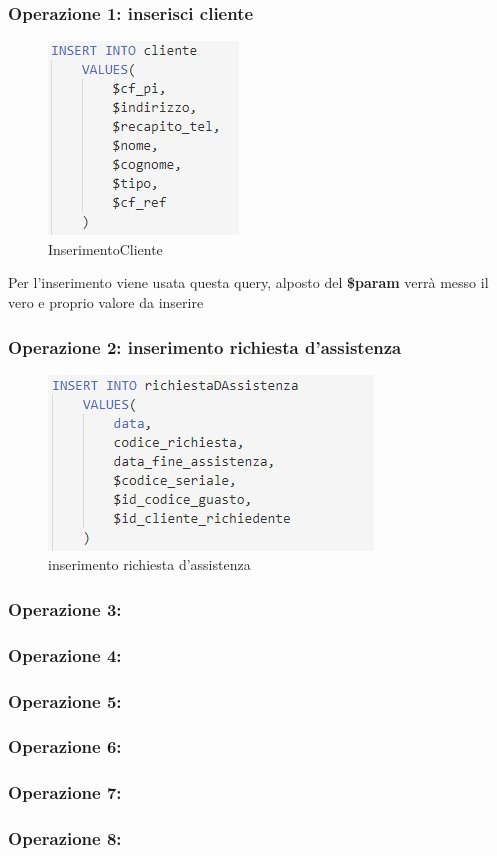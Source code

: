 \documentclass[legalpaper]{article}
\begin{document}
	\subsubsection{Operazione 1: inserisci cliente}
		\begin{figure}[h]
			\centering
			\includegraphics[width=0.2\linewidth]{Immagini SQL/query1}
			\caption{InserimentoCliente}
			\label{InserimentoClientesql}
		\end{figure}
		Per l'inserimento viene usata questa query, alposto del  \textbf{\$param} verrà messo il vero e proprio valore da inserire
\subsubsection{Operazione 2: inserimento richiesta d'assistenza}
\begin{figure}[h]
			\centering
			\includegraphics[width=0.1\linewidth]{Immagini SQL/query2}
			\caption{ inserimento richiesta d'assistenza}
			\label{ inserimento richiesta d'assistenza}
		\end{figure}
\subsubsection{Operazione 3:}
\subsubsection{Operazione 4:}
\subsubsection{Operazione 5:}
\subsubsection{Operazione 6:}
\subsubsection{Operazione 7:}
\subsubsection{Operazione 8:}
\end{document}

